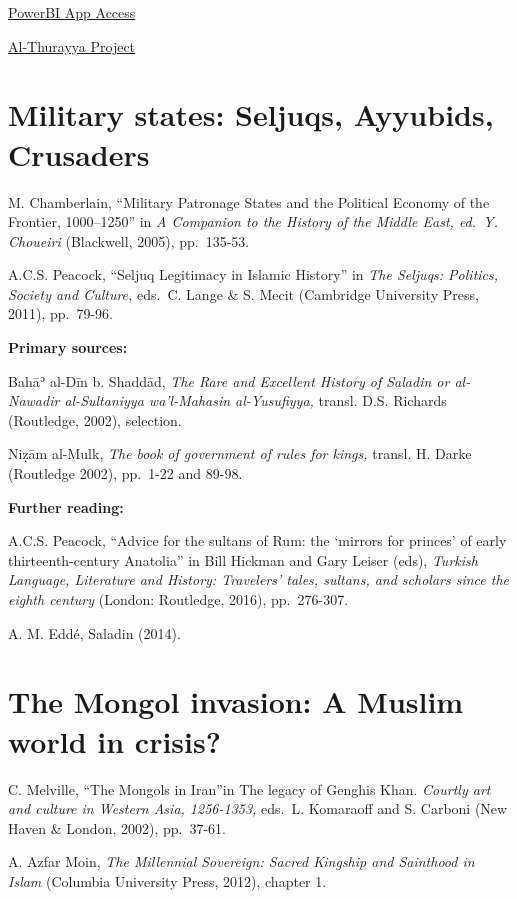 \documentclass[
]{book}
\begin{document}
\href{https://tinyurl.com/AuthorsArabic}{PowerBI App Access}

\href{https://althurayya.github.io/\#searchPane}{Al-Thurayya Project}

\hypertarget{military-states-seljuqs-ayyubids-crusaders}{%
\chapter{Military states: Seljuqs, Ayyubids, Crusaders}\label{military-states-seljuqs-ayyubids-crusaders}}

M. Chamberlain, ``Military Patronage States and the Political Economy of the Frontier, 1000--1250'' in \emph{A Companion to the History of the Middle East, ed.~Y. Choueiri} (Blackwell, 2005), pp.~135-53.

A.C.S. Peacock, ``Seljuq Legitimacy in Islamic History'' in \emph{The Seljuqs: Politics, Society and Culture,} eds.~C. Lange \& S. Mecit (Cambridge University Press, 2011), pp.~79-96.

\textbf{Primary sources:}

Bahāʾ al-Dīn b. Shaddād, \emph{The Rare and Excellent History of Saladin or al-Nawadir al-Sultaniyya wa'l-Mahasin al-Yusufiyya,} transl. D.S. Richards (Routledge, 2002), selection.

Niẓām al-Mulk, \emph{The book of government of rules for kings,} transl. H. Darke (Routledge 2002), pp.~1-22 and 89-98.

\textbf{Further reading:}

A.C.S. Peacock, ``Advice for the sultans of Rum: the `mirrors for princes' of early thirteenth-century Anatolia'' in Bill Hickman and Gary Leiser (eds), \emph{Turkish Language, Literature and History: Travelers' tales, sultans, and scholars since the eighth century} (London: Routledge, 2016), pp.~276-307.

A. M. Eddé, Saladin (2014).

\hypertarget{the-mongol-invasion-a-muslim-world-in-crisis}{%
\chapter{The Mongol invasion: A Muslim world in crisis?}\label{the-mongol-invasion-a-muslim-world-in-crisis}}

C. Melville, ``The Mongols in Iran''in The legacy of Genghis Khan. \emph{Courtly art and culture in Western Asia, 1256-1353,} eds.~L. Komaraoff and S. Carboni (New Haven \& London, 2002), pp.~37-61.

A. Azfar Moin, \emph{The Millennial Sovereign: Sacred Kingship and Sainthood in Islam} (Columbia University Press, 2012), chapter 1.
\end{document}
